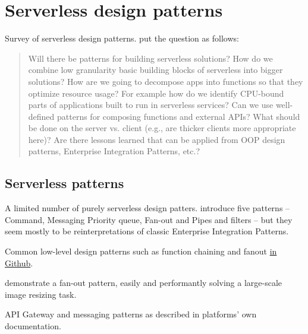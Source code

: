 \documentclass[utf8,english]{gradu3}
\begin{document}
\chapter{Serverless design patterns}

Survey of serverless design patterns. \textcite{baldini17currentTrends} put the question as follows:

\begin{quote}
Will there be patterns for building serverless solutions? How do we combine low granularity basic building blocks of serverless into bigger solutions? How are we going to decompose apps into functions so that they optimize resource usage? For example how do we identify CPU-bound parts of applications built to run in serverless services? Can we use well-defined patterns for composing functions and external APIs? What should be done on the server vs. client (e.g., are thicker clients more appropriate here)? Are there lessons learned that can be applied from OOP design patterns, Enterprise Integration Patterns, etc.?
\end{quote}

\section{Serverless patterns}


A limited number of purely serverless design patters. \textcite{sbarski2017serverless} introduce five patterns -- Command, Messaging Priority queue, Fan-out and Pipes and filters -- but they seem mostly to be reinterpretations of classic Enterprise Integration Patterns.

Common low-level design patterns such as function chaining and fanout \href{https://github.com/yochay/serverlesspatterns}{in Github}.

\textcite{mcgrath16cloudEventParadigms} demonstrate a fan-out pattern, easily and performantly solving a large-scale image resizing task.

API Gateway and messaging patterns as described in platforms' own documentation. \parencite{awslambda0218}
\end{document}
